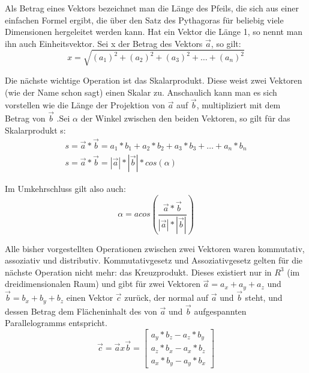 Als Betrag eines Vektors bezeichnet man die Länge des Pfeils, die sich aus einer einfachen Formel ergibt, die über den Satz des Pythagoras für beliebig viele Dimensionen hergeleitet werden kann. Hat ein Vektor die Länge 1, so nennt man ihn auch Einheitsvektor. Sei x der Betrag des Vektors $\vec{a}$, so gilt:
\begin{equation}\label{veclength}
x = \sqrt{(a_1)^2+(a_2)^2+(a_3)^2+\dots{}+(a_n)^2}
\end{equation}

Die nächste wichtige Operation ist das Skalarprodukt. Diese weist zwei Vektoren (wie der Name schon sagt) einen Skalar zu. Anschaulich kann man es sich vorstellen wie die Länge der Projektion von $\vec{a}$ auf $\vec{b}$, multipliziert mit dem Betrag von $\vec{b}$ .Sei $\alpha$ der Winkel zwischen den beiden Vektoren, so gilt für das Skalarprodukt s:
\begin{gather}\label{vecdot}
s = \vec{a} * \vec{b} = a_1*b_1 + a_2*b_2 + a_3*b_3+\dots{}+a_n*b_n\\
s = \vec{a} * \vec{b} = |\vec{a}| * |\vec{b}| * cos(\alpha)
\end{gather}

Im Umkehrschluss gilt also auch:
\begin{equation}\label{vecdot2}
\alpha=acos(\frac{\vec{a}*\vec{b}}{|\vec{a}|*|\vec{b}|})
\end{equation}

Alle bisher vorgestellten Operationen zwischen zwei Vektoren waren kommutativ, assoziativ und distributiv. Kommutativgesetz und Assoziativgesetz gelten für die nächste Operation nicht mehr: das Kreuzprodukt. Dieses existiert nur in $R^3$ (im dreidimensionalen Raum) und gibt für zwei Vektoren $\vec{a}=a_x+a_y+a_z$ und $\vec{b}=b_x+b_y+b_z$ einen Vektor $\vec{c}$ zurück, der normal auf $\vec{a}$ und $\vec{b}$ steht, und dessen Betrag dem Flächeninhalt des von $\vec{a}$ und $\vec{b}$ aufgespannten Parallelogramms entspricht.
\begin{equation}\label{veccross}
\vec{c} = \vec{a}x\vec{b} =
\begin{bmatrix} a_y*b_z - a_z*b_y \\ a_z*b_x - a_x*b_z \\ a_x*b_y - a_y*b_x \end{bmatrix}
\end{equation}

